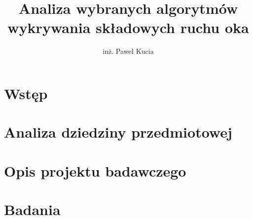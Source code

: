 \documentclass[14pt,a4paper,twoside,openright,titlepage]{extbook}
\title{Analiza wybranych algorytmów wykrywania składowych ruchu oka}
\author{inż. Paweł Kucia}
\begin{document}
        
        \cleardoublepage
        
        \cleardoublepage
    \restoregeometry
    
    \mainmatter
    \linespread{1.0}\tableofcontents
    \let\cleardoublepage\clearpage
    \pagestyle{fancy}
    \fancyhf{}
    \fancyhead[EL,OR]{\thepage}
    \fancyhead[ER]{\textit{ \nouppercase{\leftmark}}}
    \fancyhead[LO]{\textit{ \nouppercase{\rightmark}}}
    \renewcommand{\headrulewidth}{0.4pt}

    \chapter{Wstęp}
        
    \chapter{Analiza dziedziny przedmiotowej}
        
    \chapter{Opis projektu badawczego}
        
    \chapter{Badania}
        
\end{document}
